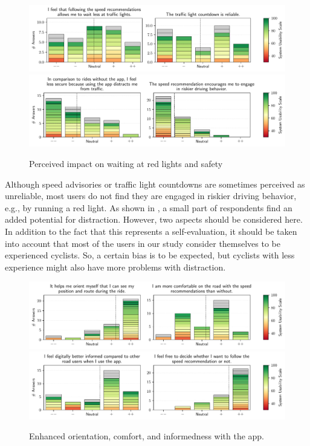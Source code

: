 \begin{figure}[t]
\caption{Perceived impact on waiting at red lights and safety}\label{fig:waiting-time-at-traffic-lights}
\includegraphics[width=\linewidth]{images/app-usability-questions-waiting-time-at-traffic-lights.pdf} 
\\
\includegraphics[width=\linewidth]{images/app-usability-questions-app-impact-on-safety.pdf}
\end{figure}

Although speed advisories or traffic light countdowns are sometimes perceived as unreliable, most users do not find they are engaged in riskier driving behavior, e.g., by running a red light. As shown in , a small part of respondents find an added potential for distraction. However, two aspects should be considered here. In addition to the fact that this represents a self-evaluation, it should be taken into account that most of the users in our study consider themselves to be experienced cyclists. So, a certain bias is to be expected, but cyclists with less experience might also have more problems with distraction.

\begin{figure}[t]
\caption{Enhanced orientation, comfort, and informedness with the app.}\label{fig:app-enhanced-orientation}
\includegraphics[width=\linewidth]{images/app-usability-questions-app-enhanced-orientation.pdf}
\\
\includegraphics[width=\linewidth]{images/app-usability-questions-app-informedness-freedom.pdf}
\end{figure}

